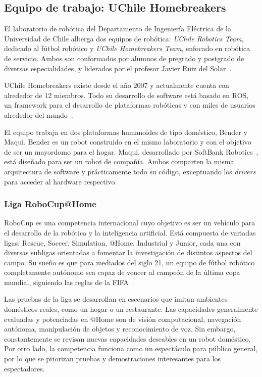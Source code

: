 \subsection{Equipo de trabajo: UChile Homebreakers}


El laboratorio de robótica del Departamento de Ingeniería Eléctrica de la Universidad de Chile alberga dos equipos de robótica: \textit{UChile Robotics Team}, dedicado al fútbol robótico y \textit{UChile Homebreakers Team}, enfocado en robótica de servicio. Ambos son conformados por alumnos de pregrado y postgrado de diversas especialidades, y liderados por el profesor Javier Ruiz del Solar~\cite{uchile-robotics}.

UChile Homebreakers existe desde el año 2007 y actualmente cuenta con alrededor de 12 miembros. Todo su desarrollo de software está basado en ROS, un framework para el desarrollo de plataformas robóticas y con miles de usuarios alrededor del mundo~\cite{ROS:2009}.

El equipo trabaja en dos plataformas humanoides de tipo doméstico, Bender y Maqui. Bender es un robot construido en el mismo laboratorio y con el objetivo de ser un mayordomo para el hogar. Maqui, desarrollado por SoftBank Robotics~\cite{softbank}, está diseñado para ser un robot de compañía. Ambos comparten la misma arquitectura de software y prácticamente todo su código, exceptuando los \textit{drivers} para acceder al hardware respectivo.

\subsubsection{Liga RoboCup@Home}

RoboCup es una competencia internacional cuyo objetivo es ser un vehículo para el desarrollo de la robótica y la inteligencia artificial. Está compuesta de variadas ligas: Rescue, Soccer, Simulation, @Home, Industrial y Junior, cada una con diversas subligas orientadas a fomentar la investigación de distintos aspectos del campo. Su sueño es que para mediados del siglo 21, un equipo de fútbol robótico completamente autónomo sea capaz de vencer al campeón de la última copa mundial, siguiendo las reglas de la FIFA~\cite{robocup:rulebook_2018}.

Las pruebas de la liga se desarrollan en escenarios que imitan ambientes domésticos reales, como un hogar o un restaurante. Las capacidades generalmente evaluadas y potenciadas en @Home son de visión computacional, navegación autónoma, manipulación de objetos y reconocimiento de voz. Sin embargo, constantemente se revisan nuevas capacidades deseables en un robot doméstico. Por otro lado, la competencia funciona como un espectáculo para público general, por lo que se priorizan pruebas y demostraciones interesantes para los espectadores.

